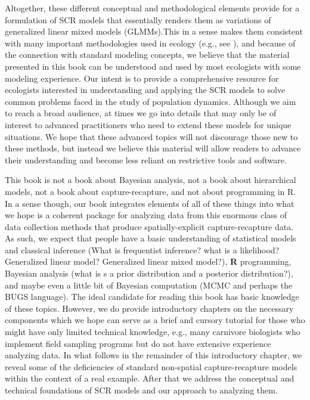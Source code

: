 Altogether, these different conceptual and methodological elements
provide for a formulation of SCR models that essentially renders them
as variations of generalized linear mixed models (GLMMs).This in a
sense makes them consistent with many important methodologies used in
ecology (e.g., see \citet{zuur_etal:2009, kery_etal:2010}), and
because of the connection with standard modeling concepts, we believe
that the material presented in this book can be understood and used by
most ecologists with some modeling experience. Our intent is to
provide a comprehensive resource for ecologists interested in
understanding and applying the SCR models to solve common problems
faced in the study of population dynamics. Although we aim to reach a
broad audience, at times we go into details that may only be of
interest to advanced practitioners who need to extend these models for
unique situations.  We hope that these advanced topics will not
discourage those new to these methods, but instead we believe this
material will allow readers to advance their understanding and become
less reliant on restrictive tools and software.

This book is not a book about Bayesian analysis, not a book about
hierarchical models, not a book about capture-recapture, and not about
programming in R. In a sense though, our book integrates elements of
all of these things into what we hope is a coherent package for
analyzing data from this enormous class of data collection methods
that produce spatially-explicit capture-recapture data.   As such, we
expect that people have a basic understanding of statistical models
and classical inference (What is frequentist inference? what is a
likelihood? Generalized linear model? Generalized linear mixed
model?),
{\bf R} programming, 
 Bayesian analysis (what is s a prior distribution and a
posterior distribution?), 
and maybe even a little bit
of Bayesian
computation (MCMC and perhaps the BUGS language).
The ideal candidate for reading this book has basic knowledge of these
topics. However, we do provide introductory chapters on the necessary
components which we hope can serve as a brief and cursory tutorial for
those who might have only limited technical knowledge, e.g., many
carnivore biologists who implement field sampling programs but do not
have extensive experience analyzing data.
In what
follows in the remainder of this introductory chapter, we reveal some
of the deficiencies of standard non-spatial capture-recapture models
within the context of a real example. After that we address the
conceptual and technical foundations of SCR models and our approach to
analyzing them. 


